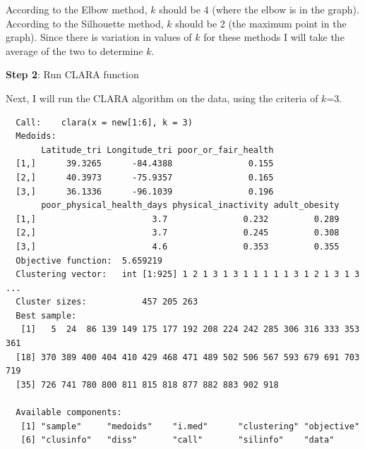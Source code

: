 \documentclass[12pt,twoside]{amherstthesis}
\begin{document}
  According to the Elbow method, \(k\) should be 4 (where the elbow is in
  the graph). According to the Silhouette method, \(k\) should be 2 (the
  maximum point in the graph). Since there is variation in values of \(k\)
  for these methods I will take the average of the two to determine \(k\).
  
  \textbf{Step 2}: Run CLARA function
  
  Next, I will run the CLARA algorithm on the data, using the criteria of
  \(k\)=3.
  
  \begin{Shaded}
  \begin{Highlighting}[]
  \StringTok{ }\NormalTok{(new[}\OperatorTok{:}\NormalTok{], }\NormalTok{)}
  \end{Highlighting}
  \end{Shaded}
  
  \begin{Shaded}
  \begin{Highlighting}[]
  \end{Highlighting}
  \end{Shaded}
  
  \begin{verbatim}
  Call:    clara(x = new[1:6], k = 3) 
  Medoids:
       Latitude_tri Longitude_tri poor_or_fair_health
  [1,]      39.3265      -84.4388               0.155
  [2,]      40.3973      -75.9357               0.165
  [3,]      36.1336      -96.1039               0.196
       poor_physical_health_days physical_inactivity adult_obesity
  [1,]                       3.7               0.232         0.289
  [2,]                       3.7               0.245         0.308
  [3,]                       4.6               0.353         0.355
  Objective function:  5.659219
  Clustering vector:   int [1:925] 1 2 1 3 1 3 1 1 1 1 1 3 1 2 1 3 1 3 ...
  Cluster sizes:           457 205 263 
  Best sample:
   [1]   5  24  86 139 149 175 177 192 208 224 242 285 306 316 333 353 361
  [18] 370 389 400 404 410 429 468 471 489 502 506 567 593 679 691 703 719
  [35] 726 741 780 800 811 815 818 877 882 883 902 918
  
  Available components:
   [1] "sample"     "medoids"    "i.med"      "clustering" "objective" 
   [6] "clusinfo"   "diss"       "call"       "silinfo"    "data"      
  \end{verbatim}
  
\end{document}
